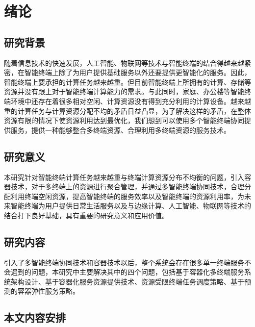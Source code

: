 \chapter{绪论}\label{chap:introduction}

\section{研究背景}
随着信息技术的快速发展，人工智能、物联网等技术与智能终端的结合得越来越紧密，在智能终端上除了为用户提供基础服务以外还要提供更智能化的服务。因此，智能终端上要承担的计算任务越来越重。但目前智能终端上所拥有的计算、存储等资源并没有跟上对于智能终端计算能力的需求。与此同时，家庭、办公楼等智能终端环境中还存在着很多相对空闲、计算资源没有得到充分利用的计算设备。越来越重的计算任务与计算资源分配不均的矛盾日益凸显，为了解决这样的矛盾，在整体资源有限的情况下使资源利用达到最优化，我们想到可以使用多个智能终端协同提供服务，提供一种能够整合多终端资源、合理利用多终端资源的服务技术。
\section{研究意义}
本研究针对智能终端计算任务越来越重与终端计算资源分布不均衡的问题，引入容器技术，对于多终端上的资源进行聚合管理，并通过多智能终端协同技术，合理分配利用终端空闲资源，提高智能终端的服务效率以及智能终端的资源利用率，为未来智能终端为用户提供日常生活服务以及与边缘计算、人工智能、物联网等技术的结合打下良好基础，具有重要的研究意义和应用价值。
\section{研究内容}
引入了多智能终端协同技术和容器技术以后，整个系统会存在很多单一终端服务不会遇到的问题，本研究中主要解决其中的四个问题，包括基于容器化多终端服务系统架构设计、基于容器化服务资源提供技术、资源受限终端任务调度策略、基于预测的容器弹性服务策略。
\section{本文内容安排}
